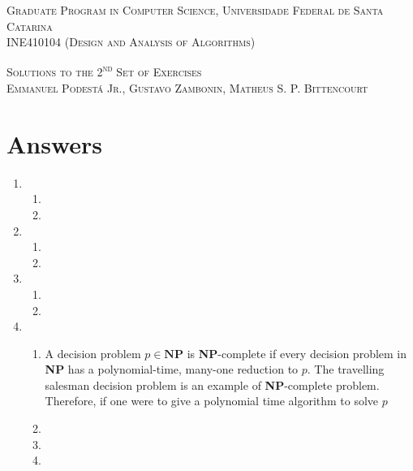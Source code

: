 \documentclass[12pt]{article}
\begin{document}
\textsc{Graduate Program in Computer Science,
  Universidade Federal de Santa Catarina} \\
\textsc{INE410104 (Design and Analysis of Algorithms)}

\textsc{Solutions to the 2\textsuperscript{nd} Set of Exercises} \\
\textsc{Emmanuel Podestá Jr., Gustavo Zambonin, Matheus S. P. Bittencourt}

\section{Answers}

\begin{enumerate}
  \item
  \begin{enumerate}
    \item 
    \item 
  \end{enumerate}
  \item
  \begin{enumerate}
    \item 
    \item 
  \end{enumerate}
  \item
  \begin{enumerate}
    \item 
    \item 
  \end{enumerate}
  \item 
  \begin{enumerate}
    \item A decision problem $p \in \mathbf{NP}$ is \textbf{NP}-complete if every decision problem in \textbf{NP} has a polynomial-time, many-one reduction to $p$. The travelling salesman decision problem is an example of \textbf{NP}-complete problem. Therefore, if one were to give a polynomial time algorithm to solve $p$
    \item 
    \item
    \item
  \end{enumerate}
\end{enumerate}
\end{document}
